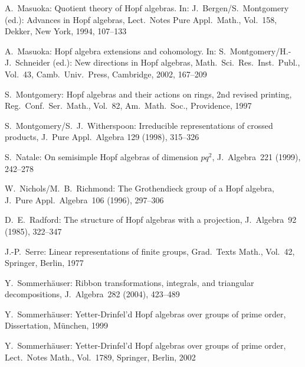 \documentclass{article}
\numberwithin{equation}{section}
\theoremstyle{definition}
\theoremstyle{break}
\newcommand{\1}{{(1)}}
\newcommand{\2}{{(2)}}
\newcommand{\3}{{(3)}}
\begin{document}
\begin{thebibliography}{99}
 A.~Masuoka: Quotient theory of Hopf algebras. In: J.~Bergen/S.~Montgomery (ed.): Advances in Hopf algebras, Lect.~Notes Pure Appl.~Math., Vol.~158, Dekker, New York, 1994, 107--133

 A.~Masuoka: Hopf algebra extensions and cohomology. In: S.~Mont\-gomery/H.-J.~Schneider (ed.): New directions in Hopf algebras, Math.~Sci.\ Res.~Inst.~Publ., Vol.~43, Camb.~Univ.~Press, Cambridge, 2002, 167--209

 S.~Montgomery: Hopf algebras and their actions on rings, 2nd
revised printing, Reg.~Conf.~Ser.~Math., Vol.~82, Am.~Math.~Soc., Providence,
1997

 S.~Montgomery/S.~J.~Witherspoon: Irreducible representations of crossed products, J.~Pure Appl.~Algebra 129 (1998), 315--326

 S.~Natale: On semisimple Hopf algebras of dimension $pq^{2}$,
J.~Algebra~221 (1999), 242--278

 W.~Nichols/M.~B.~Richmond: The Grothendieck group of a Hopf
algebra, J.~Pure Appl.~Algebra~106 (1996), 297--306

 D.~E.~Radford: The structure of Hopf algebras with a projection, J.~Algebra~92 (1985), 322--347

 J.-P.~Serre: Linear representations of finite groups, Grad.~Texts Math., Vol.~42, Springer, Berlin, 1977

 Y.~Sommerh\"auser: Ribbon transformations, integrals, and triangular decompositions, J.~Algebra~282 (2004), 423--489

 Y.~Sommerh\"auser: Yetter-Drinfel'd Hopf algebras over groups of
prime order, Dissertation, M\"unchen, 1999

 Y.~Sommerh\"auser: Yetter-Drinfel'd Hopf algebras over groups of prime order, Lect.\ Notes Math., Vol.~1789, Springer, Berlin, 2002


\end{thebibliography}
\end{document}
